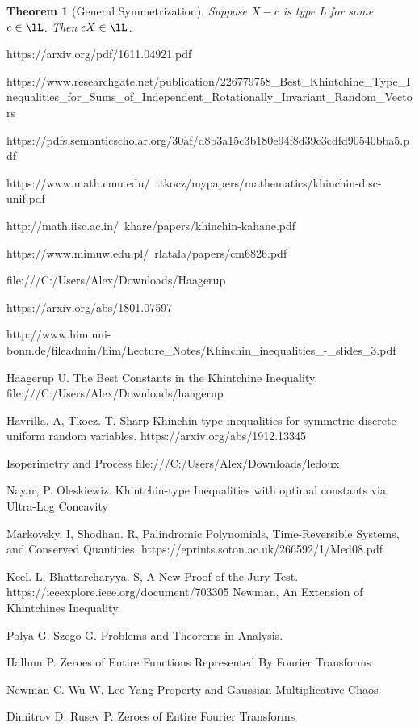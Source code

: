 \documentclass[10pt]{article}
\newcommand{\1}{\textbf{1}}
\newtheorem{theorem}{Theorem}
\theoremstyle{remark}
\theoremstyle{definition}
\begin{document}
\begin{theorem}[General Symmetrization] \label{GSYM}
	Suppose $X -c$ is type L for some $c \in \lL$. Then $\epsilon X \in \lL$.
\end{theorem}



\begin{thebibliography}{9}

https://arxiv.org/pdf/1611.04921.pdf

https://www.researchgate.net/publication/226779758_Best_Khintchine_Type_Inequalities_for_Sums_of_Independent_Rotationally_Invariant_Random_Vectors

https://pdfs.semanticscholar.org/30af/d8b3a15c3b180e94f8d39c3cdfd90540bba5.pdf

https://www.math.cmu.edu/~ttkocz/mypapers/mathematics/khinchin-disc-unif.pdf

http://math.iisc.ac.in/~khare/papers/khinchin-kahane.pdf

https://www.mimuw.edu.pl/~rlatala/papers/cm6826.pdf

file:///C:/Users/Alex/Downloads/Haagerup%

https://arxiv.org/abs/1801.07597

http://www.him.uni-bonn.de/fileadmin/him/Lecture_Notes/Khinchin_inequalities_-_slides_3.pdf

 Haagerup U. The Best Constants in the Khintchine Inequality. file:///C:/Users/Alex/Downloads/haagerup%

 Havrilla. A, Tkocz. T, Sharp Khinchin-type inequalities for symmetric discrete uniform random variables. https://arxiv.org/abs/1912.13345

 Isoperimetry and Process file:///C:/Users/Alex/Downloads/ledoux%

 Nayar, P. Oleskiewiz. Khintchin-type Inequalities with optimal constants via Ultra-Log Concavity


 Markovsky. I, Shodhan. R,
Palindromic Polynomials, Time-Reversible Systems, and Conserved Quantities. https://eprints.soton.ac.uk/266592/1/Med08.pdf

 Keel. L, Bhattarcharyya. S,
A New Proof of the Jury Test. https://ieeexplore.ieee.org/document/703305
 Newman, An Extension of Khintchines Inequality. 

 Polya G. Szego G. Problems and Theorems in Analysis. 

 Hallum P. Zeroes of Entire Functions Represented By Fourier Transforms

 Newman C. Wu W. Lee Yang Property and Gaussian Multiplicative Chaos

 Dimitrov D. Rusev P. Zeroes of Entire Fourier Transforms

\end{thebibliography}
\end{document}
